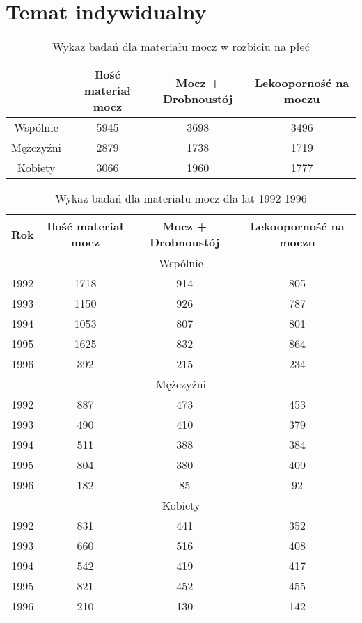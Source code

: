 \documentclass[a4paper,11pt]{article}
\begin{document}
\section{Temat indywidualny}

\begin{table}[h]
  \begin{center}
  \caption{Wykaz badań dla materiału mocz w rozbiciu na płeć}
  \begin{tabular}{|c|c|c|c|}
  \hline
  &Ilość materiał mocz & Mocz + Drobnoustój & Lekooporność na moczu \\ \hline
  Wspólnie &5945 &3698 &3496\\ \hline
Mężczyźni &2879 &1738 &1719\\ \hline
Kobiety &3066 &1960 &1777\\ \hline
  \end{tabular}
\end{center}
\end{table}

\begin{table}[h]
  \begin{center}
  \caption{Wykaz badań dla materiału mocz dla lat 1992-1996}
  \begin{tabular}{|c|c|c|c|}
  \hline
  Rok & Ilość materiał mocz & Mocz + Drobnoustój & Lekooporność na moczu \\ \hline 
  
\multicolumn{4}{|c|}{Wspólnie} \\ \hline
1992 &1718 &914 &805\\ \hline
1993 &1150 &926 &787\\ \hline
1994 &1053 &807 &801\\ \hline
1995 &1625 &832 &864\\ \hline
1996 &392 &215 &234\\ \hline



\multicolumn{4}{|c|}{Mężczyźni} \\ \hline
1992 &887 &473 &453\\ \hline
1993 &490 &410 &379\\ \hline
1994 &511 &388 &384\\ \hline
1995 &804 &380 &409\\ \hline
1996 &182 &85 &92\\ \hline



\multicolumn{4}{|c|}{Kobiety} \\ \hline
1992 &831 &441 &352\\ \hline
1993 &660 &516 &408\\ \hline
1994 &542 &419 &417\\ \hline
1995 &821 &452 &455\\ \hline
1996 &210 &130 &142\\ \hline
\end{tabular}
\end{center}
\end{table}
\end{document}
